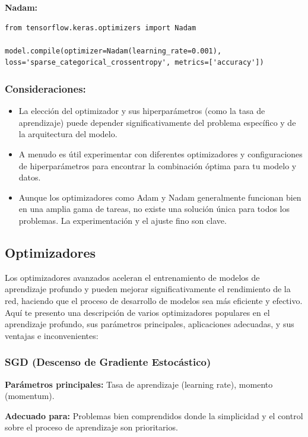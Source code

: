 \documentclass[11pt]{article}
\begin{document}
\textbf{Nadam:}

\begin{verbatim}
from tensorflow.keras.optimizers import Nadam

model.compile(optimizer=Nadam(learning_rate=0.001), loss='sparse_categorical_crossentropy', metrics=['accuracy'])
\end{verbatim}

\subsubsection{Consideraciones:}
\label{sec:orgb316cf0}
\begin{itemize}
\item La elección del optimizador y sus hiperparámetros (como la tasa de
aprendizaje) puede depender significativamente del problema específico
y de la arquitectura del modelo.
\item A menudo es útil experimentar con diferentes optimizadores y
configuraciones de hiperparámetros para encontrar la combinación
óptima para tu modelo y datos.
\item Aunque los optimizadores como Adam y Nadam generalmente funcionan bien
en una amplia gama de tareas, no existe una solución única para todos
los problemas. La experimentación y el ajuste fino son clave.
\end{itemize}

\subsection{Optimizadores}
\label{sec:org50a8da7}
Los optimizadores avanzados aceleran el entrenamiento de modelos de
aprendizaje profundo y pueden mejorar significativamente el rendimiento
de la red, haciendo que el proceso de desarrollo de modelos sea más
eficiente y efectivo. Aquí te presento una descripción de varios
optimizadores populares en el aprendizaje profundo, sus parámetros
principales, aplicaciones adecuadas, y sus ventajas e inconvenientes:


\subsubsection{SGD (Descenso de Gradiente Estocástico)}
\label{sec:orga229b91}
\textbf{Parámetros principales:} Tasa de aprendizaje (learning rate), momento
(momentum).

\textbf{Adecuado para:} Problemas bien comprendidos donde la simplicidad y el
control sobre el proceso de aprendizaje son prioritarios.
\end{document}
